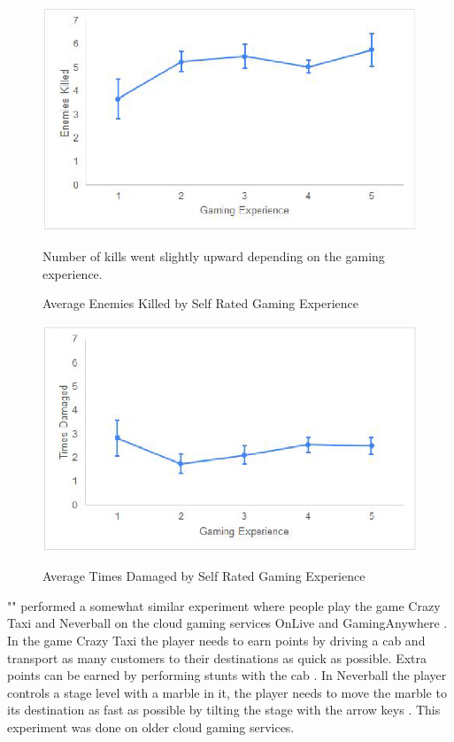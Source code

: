 \begin{figure}[H]
	\centering
	\includegraphics[width=12cm]{../img/fig18.png}
	\caption{Average Enemies Killed by Self Rated Gaming Experience}
	Number of kills went slightly upward depending on the gaming experience.\\
	\parencite[Chapter 4.2.3, Page 41, Figure 18]{desveaux2020effects}
\end{figure}
\begin{figure}[H]
	\centering
	\includegraphics[width=12cm]{../img/fig19.png}
	\caption{Average Times Damaged by Self Rated Gaming Experience}
	\parencite[Chapter 4.2.3, Page 41, Figure 19]{desveaux2020effects}
\end{figure}
\newpage
"\textcite{claypool2014effects}" performed a somewhat similar experiment where people play the game Crazy Taxi and Neverball on the cloud gaming services OnLive and GamingAnywhere \parencite[Chapter 3]{claypool2014effects}. In the game Crazy Taxi the player needs to earn points by driving a cab and transport as many customers to their destinations as quick as possible. Extra points can be earned by performing stunts with the cab \parencite[Chapter 3.A]{claypool2014effects}. In Neverball the player controls a stage level with a marble in it, the player needs to move the marble to its destination as fast as possible by tilting the stage with the arrow keys \parencite[Chapter 3.A]{claypool2014effects}. This experiment was done on older cloud gaming services.
